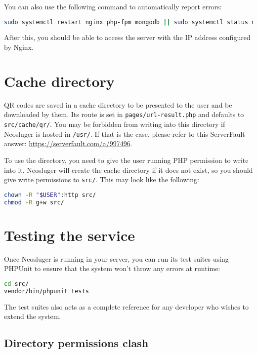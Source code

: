 You can also use the following command to automatically report errors:

\begin{lstlisting}[language=sh]
sudo systemctl restart nginx php-fpm mongodb || sudo systemctl status nginx
\end{lstlisting}

After this, you should be able to access the server with the IP address configured by Nginx.

\section{Cache directory}\label{cache-directory}

QR codes are saved in a cache directory to be presented to the user and be downloaded by them.
Its route is set in \texttt{pages/url-result.php} and defaults to \texttt{src/cache/qr/}.
You may be forbidden from writing into this directory if Neosluger is hosted in \texttt{/usr/}.
If that is the case, please refer to this ServerFault answer: \url{https://serverfault.com/a/997496}.

To use the directory, you need to give the user running PHP permission to write into it.
Neosluger will create the cache directory if it does not exist, so you should give write permissions to \texttt{src/}.
This may look like the following:

\begin{lstlisting}[language=sh]
chown -R "$USER":http src/
chmod -R g+w src/
\end{lstlisting}

\section{Testing the service}\label{testing-the-service}

Once Neosluger is running in your server, you can run its test suites using PHPUnit to ensure that the system won't throw any errors at runtime:

\begin{lstlisting}[language=sh]
cd src/
vendor/bin/phpunit tests
\end{lstlisting}

The test suites also acts as a complete reference for any developer who wishes to extend the system.

\subsection{Directory permissions clash}

